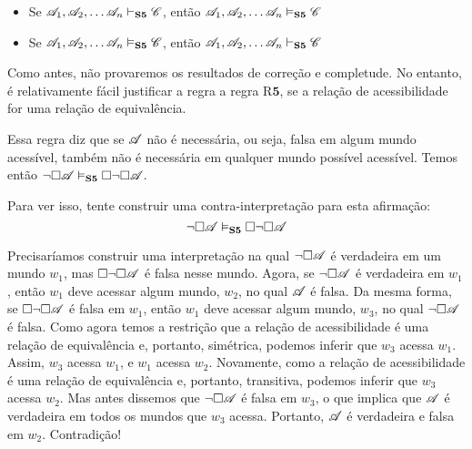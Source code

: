 \begin{itemize}
	\item Se $\mathscr{A}_1,\mathscr{A}_2, \dots \mathscr{A}_n\vdash_{\mathbf{S5}} \mathscr{C}$, então $\mathscr{A}_1,\mathscr{A}_2, \dots \mathscr{A}_n\vDash_{\mathbf{S5}} \mathscr{C}$
	\item Se $\mathscr{A}_1,\mathscr{A}_2, \dots \mathscr{A}_n\vDash_{\mathbf{S5}} \mathscr{C}$, então $\mathscr{A}_1,\mathscr{A}_2, \dots \mathscr{A}_n\vdash_{\mathbf{S5}} \mathscr{C}$
\end{itemize}
Como antes,  não  provaremos os resultados de correção e completude.  No entanto, é relativamente fácil  justificar a regra a regra R$\mathbf{5}$,  se a relação de acessibilidade for uma relação de equivalência.

Essa regra diz que se $\mathscr{A}$ não é necessária, ou seja, falsa em algum mundo acessível, também não é necessária em qualquer mundo possível acessível. Temos então $\neg\Box \mathscr{A} \vDash_{\mathbf{S5}}  \Box\neg\Box \mathscr{A}$.

Para ver isso, tente construir uma contra-interpretação para esta afirmação:
\[
	\neg\Box\mathscr{A} \vDash_{\mathbf{S5}}  \Box \neg\Box \mathscr{A}
\]
 
Precisaríamos construir uma interpretação  na qual  $\neg\Box\mathscr{A}$ é verdadeira em um mundo $w_1$, mas  $\Box \neg\Box \mathscr{A}$  é falsa nesse mundo.  Agora, se $\neg\Box\mathscr{A}$ é verdadeira em  $w_1$, então  $w_1$ deve acessar algum mundo, $w_2$, no qual $\mathscr{A}$ é falsa. Da mesma forma, se $\Box \neg\Box \mathscr{A}$ é falsa em  $w_1$, então  $w_1$ deve acessar algum mundo, $w_3$, no qual $\neg\Box \mathscr{A}$ é falsa. Como agora temos a restrição que a relação de acessibilidade é uma relação de equivalência e, portanto, simétrica, podemos inferir que $w_3$ acessa  $w_1$. Assim, $w_3$ acessa  $w_1$, e  $w_1$ acessa $w_2$. Novamente, como a relação de acessibilidade é uma relação de equivalência e, portanto, transitiva, podemos inferir que $w_3$ acessa $w_2$. Mas antes dissemos que $\neg\Box \mathscr{A}$ é falsa em $w_3$, o que implica que $\mathscr{A}$ é verdadeira em todos os mundos que $w_3$ acessa. Portanto, $\mathscr{A}$ é verdadeira e falsa em $w_2$. Contradição!

